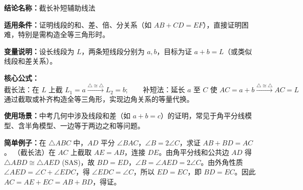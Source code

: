 \textbf{结论名称：}截长补短辅助线法

\textbf{适用条件：}证明线段的和、差、倍、分关系（如 $AB+CD=EF$），直接证明困难，特别是需构造全等三角形时。

\textbf{变量说明：}设长线段为 $L$，两条短线段分别为 $a,b$，目标为证 $a+b=L$（或类似线段和差关系）。

\textbf{核心公式：}
\[
\boxed{\text{截长法：在 } L \text{ 上截 } L_1=a \xrightarrow{\triangle\cong\triangle} L_2=b;\qquad
\text{补短法：延长 } a \text{ 至 } C \text{ 使 } AC=a+b \xrightarrow{\triangle\cong\triangle} AC = L}
\]
通过截取或补齐构造全等三角形，实现边角关系的等量代换。

\textbf{使用场景：}中考几何中涉及线段和差（如 $a+b=c$）的证明，常见于角平分线模型、含半角模型、一边等于两边之和等问题。

\textbf{简单例子：}在 $\triangle ABC$ 中，$AD$ 平分 $\angle BAC$，$\angle B=2\angle C$，求证 $AB+BD=AC$。
\noindent（截长法）在 $AC$ 上截取 $AE=AB$，连接 $DE$。由角平分线和公共边 $AD$ 得 $\triangle ABD \cong \triangle AED$ (SAS)，故 $BD=ED$，$\angle B=\angle AED=2\angle C$。由外角性质 $\angle AED=\angle C+\angle EDC$，得 $\angle EDC=\angle C$，所以 $ED=EC$，即 $BD=EC$。因此 $AC=AE+EC=AB+BD$，得证。